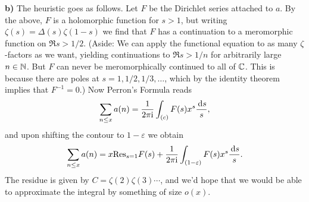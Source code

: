 \documentclass[a4paper,11pt]{article}
\begin{document}
\textbf{b)} The heuristic goes as follows. Let $F$ be the Dirichlet series attached
to $a$. By the above, $F$ is a holomorphic function for $s > 1$, but writing 
$\zeta(s) = \Delta(s) \zeta(1-s)$ we find that $F$ has a continuation to a 
meromorphic function on $\Re s > 1/2$. (Aside: We can apply the functional equation
to as many $\zeta$-factors as we want, yielding continuations to $\Re s > 1/n$ for 
arbitrarily large $n \in \mathbb{N}$. But $F$ can never be meromorphically continued
to all of $\mathbb{C}$. This is because there are poles at $s=1, 1/2, 1/3, \dots$, which 
by the identity theorem implies that $F^{-1}=0$.) Now Perron's Formula reads
\[
    \sum_{n \leq x} a(n) = \frac{1}{2 \pi \mathrm i} \int_{(c)} F(s) x^s \frac{\mathrm{\,d} s}s,
\]
and upon shifting the contour to $1-\varepsilon$ we obtain
\[
    \sum_{n \leq x}a(n) = x\text{Res}_{s=1} F(s) + \frac{1}{2 \pi \mathrm i} \int_{(1-\varepsilon)}
    F(s)x^s \frac{\mathrm{\,d} s}s.
\]
The residue is given by $C = \zeta(2) \zeta(3) \cdots$, and we'd hope that we would be able to approximate the integral by something of size 
$o(x)$.
\end{document}
